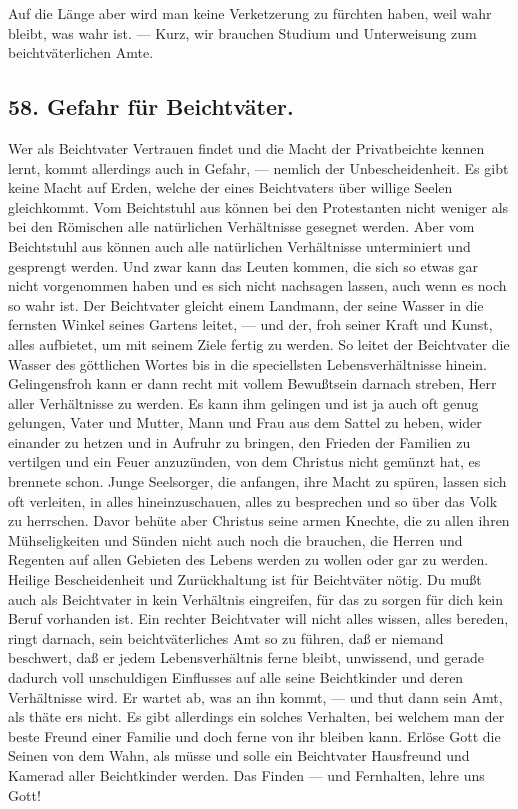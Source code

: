 Auf die Länge aber wird man keine Verketzerung zu fürchten haben, weil wahr bleibt, was wahr ist. — Kurz, wir brauchen Studium und Unterweisung zum beichtväterlichen Amte.

\subsection*{58. Gefahr für Beichtväter.}

Wer als Beichtvater Vertrauen findet und die Macht der Privatbeichte kennen lernt, kommt allerdings auch in Gefahr, — nemlich der Unbescheidenheit. Es gibt keine Macht auf Erden, welche der eines Beichtvaters über willige Seelen gleichkommt. Vom Beichtstuhl aus können bei den Protestanten nicht weniger als bei den Römischen alle natürlichen Verhältnisse gesegnet werden. Aber vom Beichtstuhl aus können auch alle natürlichen Verhältnisse unterminiert und gesprengt werden. Und zwar kann das Leuten kommen, die sich so etwas gar nicht vorgenommen haben und es sich nicht nachsagen lassen, auch wenn es noch so wahr ist. Der Beichtvater gleicht einem Landmann, der seine Wasser in die fernsten Winkel seines Gartens leitet, — und der, froh seiner Kraft und Kunst, alles aufbietet, um mit seinem Ziele fertig zu werden. So leitet der Beichtvater die Wasser des göttlichen Wortes bis in die speciellsten Lebensverhältnisse hinein. Gelingensfroh kann er dann recht mit vollem Bewußtsein darnach streben, Herr aller Verhältnisse zu werden. Es kann ihm gelingen und ist ja auch oft genug gelungen, Vater und Mutter, Mann und Frau aus dem Sattel zu heben, wider einander zu hetzen und in Aufruhr zu bringen, den Frieden der Familien zu vertilgen und ein Feuer anzuzünden, von dem
Christus nicht gemünzt hat, es brennete schon. Junge Seelsorger, die anfangen, ihre Macht zu spüren, lassen sich oft verleiten, in alles hineinzuschauen, alles zu besprechen und so über das Volk zu herrschen. Davor behüte aber Christus seine armen Knechte, die zu allen ihren Mühseligkeiten und Sünden nicht auch noch die brauchen, die Herren und Regenten auf allen Gebieten des Lebens werden zu wollen oder gar zu werden. Heilige Bescheidenheit und Zurückhaltung ist für Beichtväter nötig. Du mußt auch als Beichtvater in kein Verhältnis eingreifen, für das zu sorgen für dich kein Beruf vorhanden ist. Ein rechter Beichtvater will nicht alles wissen, alles bereden, ringt darnach, sein beichtväterliches Amt so zu führen, daß er niemand beschwert, daß er jedem Lebensverhältnis ferne bleibt, unwissend, und gerade dadurch voll unschuldigen Einflusses auf alle seine Beichtkinder und deren Verhältnisse wird. Er wartet ab, was an ihn kommt, — und thut dann sein Amt, als thäte ers nicht. Es gibt allerdings ein solches Verhalten, bei welchem man der beste Freund einer Familie und doch ferne von ihr bleiben kann. Erlöse Gott die Seinen von dem Wahn, als müsse und solle ein Beichtvater Hausfreund und Kamerad aller Beichtkinder werden. Das Finden — und Fernhalten, lehre uns Gott!

